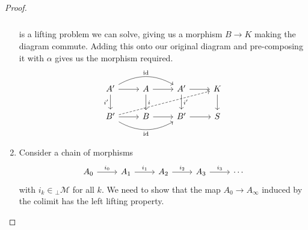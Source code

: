 \documentclass[main.tex]{subfiles}
\begin{document}
\begin{proof}
\begin{enumerate}
\begin{equation*}
\begin{tikzcd}
        \end{tikzcd}
      \end{equation*}
      is a lifting problem we can solve, giving us a morphism $B \to K$ making the diagram commute. Adding this onto our original diagram and pre-composing it with $\alpha$ gives us the morphism required.
      \begin{equation}
        \begin{tikzcd}
          A'
          \arrow[rr, bend left, "\id"]
          \arrow[r]
          \arrow[d, swap, "i'"]
          & A
          \arrow[r]
          \arrow[d, "i"]
          & A'
          \arrow[d, "i'"]
          \arrow[r]
          & K
          \arrow[d]
          \\
          B'
          \arrow[rr, bend right, swap, "\id"]
          \arrow[r]
          \arrow[urrr, dashed]
          & B
          \arrow[r]
          & B'
          \arrow[r]
          & S
        \end{tikzcd}
      \end{equation}

    \item Consider a chain of morphisms
      \begin{equation*}
        \begin{tikzcd}
          A_{0}
          \arrow[r, "i_{0}"]
          & A_{1}
          \arrow[r, "i_{1}"]
          & A_{2}
          \arrow[r, "i_{2}"]
          & A_{3}
          \arrow[r, "i_{3}"]
          & \cdots
        \end{tikzcd}
      \end{equation*}
      with $i_{k} \in {}_{\perp}\mathcal{M}$ for all $k$. We need to show that the map $A_{0} \to A_{\infty}$ induced by the colimit has the left lifting property.


\end{enumerate}
\end{proof}
\end{document}
